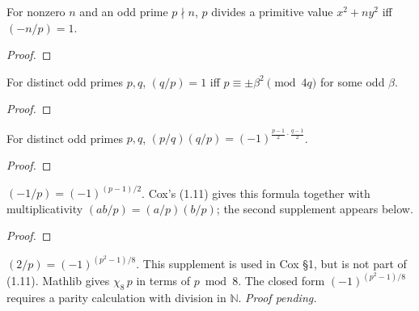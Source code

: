 \begin{theorem}
  \label{lem:dvd_iff_isSquare}
  \leanok
  For nonzero $n$ and an odd prime $p \nmid n$, $p$ divides a primitive value
  $x^2+ny^2$ iff $(-n/p) = 1$.
\end{theorem}
\begin{proof}
\end{proof}

\begin{theorem}
  \label{conj:euler_reciprocity}
  \leanok
  For distinct odd primes $p,q$, $(q/p)=1$ iff $p \equiv \pm\beta^2 \pmod{4q}$ for
  some odd $\beta$.
\end{theorem}
\begin{proof}
\end{proof}

\begin{theorem}
  \label{thm:quadratic_reciprocity}
  \leanok
  For distinct odd primes $p,q$,
  $(p/q)(q/p) = (-1)^{\frac{p-1}{2}\cdot\frac{q-1}{2}}$.
\end{theorem}
\begin{proof}\leanok
\end{proof}

\begin{theorem}
  \label{thm:legendre_supplementary}
  \leanok
  $(-1/p) = (-1)^{(p-1)/2}$. Cox's (1.11) gives this formula together with
  multiplicativity $(ab/p)=(a/p)(b/p)$; the second supplement appears below.
\end{theorem}
\begin{proof}\leanok
\end{proof}

\begin{theorem}
  \label{thm:legendre_second_supplement}
  \leanok
  \notready
  $(2/p) = (-1)^{(p^2-1)/8}$. This supplement is used in Cox \S1, but is not part
  of (1.11). Mathlib gives $\chi_8\,p$ in terms of $p \bmod 8$. The closed form
  $(-1)^{(p^2-1)/8}$ requires a parity calculation with division in $\mathbb N$.
  \emph{Proof pending.}
\end{theorem}

